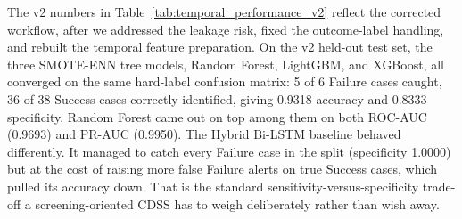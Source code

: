 \documentclass[12pt]{article}
\renewcommand{\_}{\textunderscore\allowbreak}
\begin{document}
\begin{table}[H]
\caption{Version 2 (v2) Test Set Performance Metrics of Temporal Models (M12)}
\label{tab:temporal_performance_v2}
\end{table}

The v2 numbers in Table~\ref{tab:temporal_performance_v2} reflect the corrected workflow, after we addressed the leakage risk, fixed the outcome-label handling, and rebuilt the temporal feature preparation. On the v2 held-out test set, the three SMOTE-ENN tree models, Random Forest, LightGBM, and XGBoost, all converged on the same hard-label confusion matrix: 5 of 6 Failure cases caught, 36 of 38 Success cases correctly identified, giving 0.9318 accuracy and 0.8333 specificity. Random Forest came out on top among them on both ROC-AUC (0.9693) and PR-AUC (0.9950). The Hybrid Bi-LSTM baseline behaved differently. It managed to catch every Failure case in the split (specificity 1.0000) but at the cost of raising more false Failure alerts on true Success cases, which pulled its accuracy down. That is the standard sensitivity-versus-specificity trade-off a screening-oriented CDSS has to weigh deliberately rather than wish away.
\end{document}
